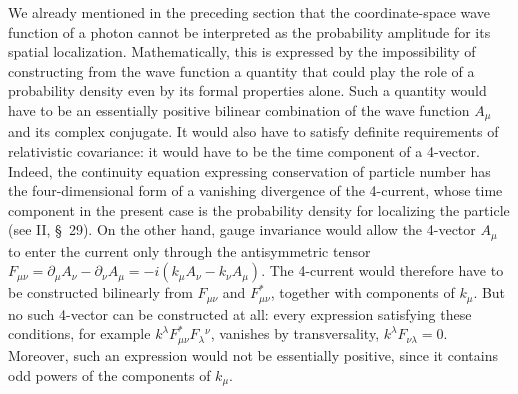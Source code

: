 We already mentioned in the preceding section that the coordinate-space wave function of a photon cannot be interpreted as the probability amplitude for its spatial localization. Mathematically, this is expressed by the impossibility of constructing from the wave function a quantity that could play the role of a probability density even by its formal properties alone. Such a quantity would have to be an essentially positive bilinear combination of the wave function $A_\mu$ and its complex conjugate. It would also have to satisfy definite requirements of relativistic covariance: it would have to be the time component of a 4-vector. Indeed, the continuity equation expressing conservation of particle number has the four-dimensional form of a vanishing divergence of the 4-current, whose time component in the present case is the probability density for localizing the particle (see II, \S~29). On the other hand, gauge invariance would allow the 4-vector $A_\mu$ to enter the current only through the antisymmetric tensor $F_{\mu\nu} = \partial_\mu A_\nu - \partial_\nu A_\mu = -i(k_\mu A_\nu - k_\nu A_\mu)$. The 4-current would therefore have to be constructed bilinearly from $F_{\mu\nu}$ and $F^*_{\mu\nu}$, together with components of $k_\mu$. But no such 4-vector can be constructed at all: every expression satisfying these conditions, for example $k^\lambda F^*_{\mu\nu}F_\lambda{}^\nu$, vanishes by transversality, $k^\lambda F_{\nu\lambda} = 0$. Moreover, such an expression would not be essentially positive, since it contains odd powers of the components of $k_\mu$.
